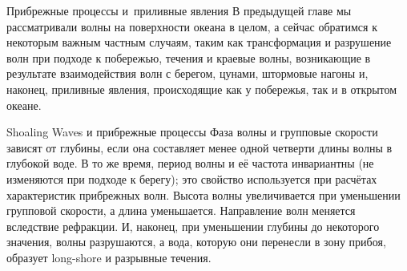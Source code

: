
\begin{chapter}{Прибрежные процессы и~приливные явления}\label{chap:17}
В предыдущей главе мы рассматривали волны на поверхности океана в целом,
а сейчас обратимся к некоторым важным частным случаям, таким как
трансформация и разрушение волн при подходе к побережью, 
течения и краевые волны, возникающие в результате взаимодействия волн 
с берегом, цунами, штормовые нагоны и, наконец, 
приливные явления, происходящие как у побережья, так и в открытом океане.
%

\begin{section}{Shoaling Waves и прибрежные процессы}
Фаза волны и групповые скорости зависят от глубины,
если она составляет менее одной четверти длины волны в глубокой воде.
В то же время, период волны и её частота инвариантны (не изменяются при 
подходе к берегу); это свойство используется при расчётах характеристик
прибрежных волн. Высота волны увеличивается при уменьшении групповой скорости,
а длина уменьшается. Направление волн меняется вследствие рефракции. 
И, наконец, при уменьшении глубины до некоторого значения, 
волны разрушаются, а вода, которую они перенесли в зону прибоя, образует
long-shore и разрывные течения.
%


\end{section}
\end{chapter}
